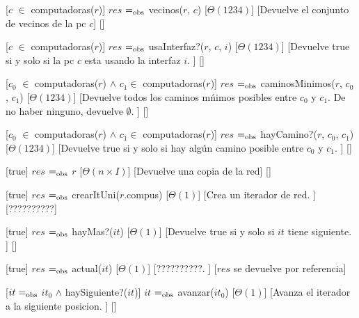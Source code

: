 \begin{Interfaz}
  [$c$ $\in$ computadoras($r$)]%
  {$res$ $=_{\mathrm{obs}}$ vecinos($r$, $c$)}%
  [$\Theta(1234)$]%
  [Devuelve el conjunto de vecinos de la pc $c$]%
  []%
  
  [$c$ $\in$ computadoras($r$)]%
  {$res$ $=_{\mathrm{obs}}$ usaInterfaz?($r$, $c$, $i$)}%
  [$\Theta(1234)$]%
  [Devuelve true si y solo si la pc $c$ esta usando la interfaz $i$. ]%
  []%
  
  [$c_{0}$ $\in$ computadoras($r$) $\land$ $c_{1} \in $ computadoras($r$)]%
  {$res$ $=_{\mathrm{obs}}$ caminosMinimos($r$, $c_{0}$, $c_{1}$)}%
  [$\Theta(1234)$]%
  [Devuelve todos los caminos m\'nimos posibles entre $c_{0}$ y $c_{1}$. De no haber ninguno, devuelve $\emptyset$. ]%
  []%
  
  [$c_{0}$ $\in$ computadoras($r$) $\land$ $c_{1} \in $ computadoras($r$)]%
  {$res$ $=_{\mathrm{obs}}$ hayCamino?($r$, $c_{0}$, $c_{1}$)}%
  [$\Theta(1234)$]%
  [Devuelve true si y solo si hay alg\'un camino posible entre $c_{0}$ y $c_{1}$. ]%
  []%
  
  [true]%
  {$res$ $=_{\mathrm{obs}}$ $r$}%
  [$\Theta(n \times I)$]%
  [Devuelve una copia de la red]%
  []%


  [true]%
  {$res$ $=_{\mathrm{obs}}$ crearItUni($r$.compus)}%
  [$\Theta(1)$]%
  [Crea un iterador de red.  ]%
  [??????????]%

  [true]%
  {$res$ $=_{\mathrm{obs}}$ hayMas?($it$)}%
  [$\Theta(1)$]%
  [Devuelve true si y solo si $it$ tiene siguiente. ]%
  []%

  [true]%
  {$res$ $=_{\mathrm{obs}}$ actual($it$)}%
  [$\Theta(1)$]%
  [??????????. ]%
  [$res$ se devuelve por referencia]%

  [$it =_{\mathrm{obs}}$ $it_{0}$ $\land$ haySiguiente?($it$)]%
  {$it$ $=_{\mathrm{obs}}$ avanzar($it_{0}$)}%
  [$\Theta(1)$]%
  [Avanza el iterador a la siguiente posicion. ]%
  []%
  

\end{Interfaz}

